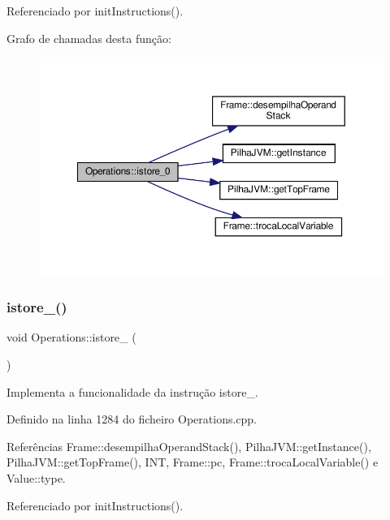 Referenciado por init\+Instructions().

Grafo de chamadas desta função\+:\nopagebreak
\begin{figure}[H]
\begin{center}
\leavevmode
\includegraphics[width=350pt]{classOperations_ae0a17c510b570467f5b025e3dcbe1398_cgraph}
\end{center}
\end{figure}
\mbox{\label{classOperations_aeb89677195b16d5c595ec9faaddc2c76}} 
\subsubsection{\texorpdfstring{istore\+\_()}{istore\_1()}}
{\footnotesize\ttfamily void Operations\+::istore\+\_ (\begin{DoxyParamCaption}{ }\end{DoxyParamCaption})\hspace{0.3cm}{\ttfamily [private]}}



Implementa a funcionalidade da instrução istore\+\_. 



Definido na linha 1284 do ficheiro Operations.\+cpp.



Referências Frame\+::desempilha\+Operand\+Stack(), Pilha\+J\+V\+M\+::get\+Instance(), Pilha\+J\+V\+M\+::get\+Top\+Frame(), I\+NT, Frame\+::pc, Frame\+::troca\+Local\+Variable() e Value\+::type.



Referenciado por init\+Instructions().

